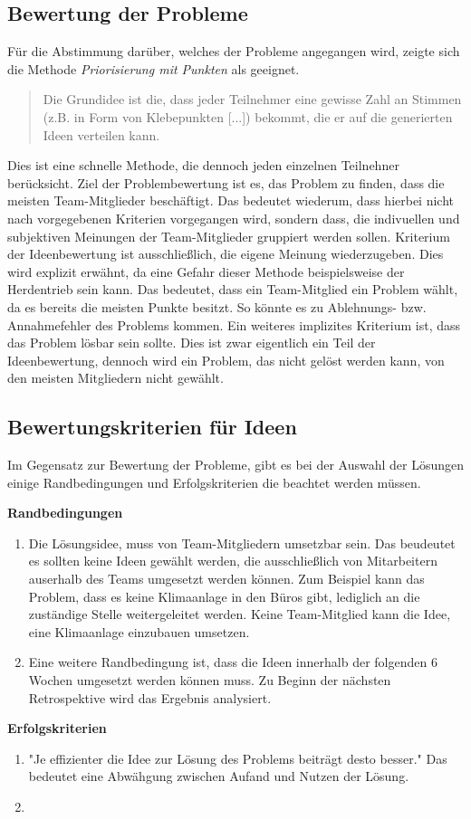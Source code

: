 \subsection{Bewertung der Probleme}\label{sec:retro-punkte}
Für die Abstimmung darüber, welches der Probleme angegangen wird, zeigte sich die Methode \textit{Priorisierung mit Punkten} 
als geeignet. 
\begin{quote}
    Die Grundidee ist die, dass jeder Teilnehmer eine gewisse Zahl an Stimmen (z.B. in Form von Klebepunkten [...]) bekommt, die er auf die generierten Ideen verteilen kann. \cite{dotmocracy:2011}
\end{quote} 
Dies ist eine schnelle Methode, die dennoch jeden einzelnen Teilnehner berücksicht. Ziel der Problembewertung ist es, das Problem zu 
finden, dass die meisten Team-Mitglieder beschäftigt. Das bedeutet wiederum, dass hierbei nicht nach vorgegebenen Kriterien 
vorgegangen wird, sondern dass, die indivuellen und subjektiven Meinungen der Team-Mitglieder gruppiert werden sollen. 
Kriterium der Ideenbewertung ist ausschließlich, die eigene Meinung wiederzugeben. Dies wird explizit erwähnt, 
da eine Gefahr dieser Methode beispielsweise der Herdentrieb sein kann. Das bedeutet, dass ein Team-Mitglied 
ein Problem wählt, da es bereits die meisten Punkte besitzt. So könnte es zu Ablehnungs- bzw. Annahmefehler des Problems kommen. \cite{derby:2012}
Ein weiteres implizites Kriterium ist, dass das Problem lösbar sein sollte. Dies ist zwar eigentlich ein Teil der Ideenbewertung, 
dennoch wird ein Problem, das nicht gelöst werden kann, von den meisten Mitgliedern nicht gewählt. 

\subsection{Bewertungskriterien für Ideen}\label{sec:retro-kriterien}
Im Gegensatz zur Bewertung der Probleme, gibt es bei der Auswahl der Lösungen einige Randbedingungen
und Erfolgskriterien die beachtet werden müssen.

\textbf{Randbedingungen}
\begin{enumerate}
    \item Die Lösungsidee, muss von Team-Mitgliedern umsetzbar sein. Das beudeutet es sollten keine Ideen gewählt werden, die ausschließlich von Mitarbeitern auserhalb des Teams
    umgesetzt werden können. Zum Beispiel kann das Problem, dass es keine Klimaanlage in den Büros gibt, lediglich an die zuständige Stelle weitergeleitet werden.
    Keine Team-Mitglied kann die Idee, eine Klimaanlage einzubauen umsetzen. 
    \item Eine weitere Randbedingung ist, dass die Ideen innerhalb der folgenden 6 Wochen umgesetzt werden können muss. Zu Beginn der 
    nächsten Retrospektive wird das Ergebnis analysiert.
\end{enumerate}
\textbf{Erfolgskriterien}
\begin{enumerate}
    \item "Je effizienter die Idee zur Lösung des Problems beiträgt desto besser." 
    Das bedeutet eine Abwähgung zwischen Aufand und Nutzen der Lösung.
    \item {}
\end{enumerate}
